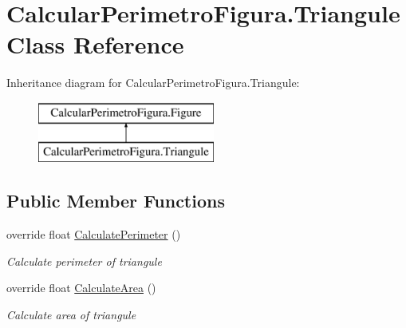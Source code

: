 \hypertarget{class_calcular_perimetro_figura_1_1_triangule}{}\section{Calcular\+Perimetro\+Figura.\+Triangule Class Reference}
\label{class_calcular_perimetro_figura_1_1_triangule}
Inheritance diagram for Calcular\+Perimetro\+Figura.\+Triangule\+:\begin{figure}[H]
\begin{center}
\leavevmode
\includegraphics[height=2.000000cm]{class_calcular_perimetro_figura_1_1_triangule}
\end{center}
\end{figure}
\subsection*{Public Member Functions}
\begin{DoxyCompactItemize}
\item 
override float \hyperlink{class_calcular_perimetro_figura_1_1_triangule_ab9a723aed2ec2eda4f25fc554a3a491b}{Calculate\+Perimeter} ()
\begin{DoxyCompactList}\small\item\em Calculate perimeter of triangule \end{DoxyCompactList}\item 
override float \hyperlink{class_calcular_perimetro_figura_1_1_triangule_a6ebfd38f68c42d0859208fdbf8736f7d}{Calculate\+Area} ()
\begin{DoxyCompactList}\small\item\em Calculate area of triangule \end{DoxyCompactList}\end{DoxyCompactItemize}
